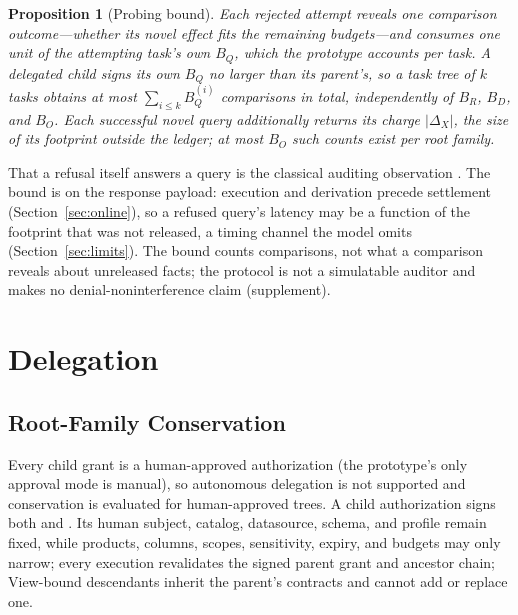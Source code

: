 \documentclass[10pt,journal,compsoc]{IEEEtran}
\newcommand{\code}[1]{\texttt{\detokenize{#1}}}
\newtheorem{proposition}{Proposition}
\begin{document}
\begin{proposition}[Probing bound]
\label{prop:probing-bound}
Each rejected attempt reveals one comparison outcome---whether its novel
effect fits the remaining budgets---and consumes one unit of the attempting
task's own $B_Q$, which the prototype accounts per task. A delegated child
signs its own $B_Q$ no larger than its parent's, so a task tree of $k$ tasks
obtains at most $\sum_{i\le k}B_Q^{(i)}$ comparisons in total, independently
of $B_R$, $B_D$, and $B_O$. Each successful novel query additionally
returns its charge $|\Delta_X|$, the size of its footprint outside the
ledger; at most $B_O$ such counts exist per root family.
\end{proposition}
That a refusal itself answers a query is the classical auditing observation
\cite{denning1980tracker,kenthapadi2005simulatable,nabar2006robustness}.
The bound is on the response payload: execution and derivation precede
settlement (Section~\ref{sec:online}), so a refused query's latency may be
a function of the footprint that was not released, a timing channel the
model omits (Section~\ref{sec:limits}). The bound counts comparisons, not
what a comparison reveals about unreleased facts; the protocol is not a
simulatable auditor and makes no denial-noninterference claim (supplement).

\section{Delegation}
\label{sec:delegation}

\subsection{Root-Family Conservation}

Every child grant is a human-approved authorization (the prototype's only
approval mode is manual), so autonomous delegation is not supported and
conservation is evaluated for human-approved trees. A child authorization
signs both \code{root_task_id} and \code{parent_task_id}. Its human subject, catalog, datasource, schema, and
profile remain fixed, while products, columns, scopes, sensitivity, expiry, and
budgets may only narrow; every execution revalidates the signed
parent grant and ancestor chain; View-bound descendants inherit
the parent's contracts and cannot add or replace one.
\end{document}
